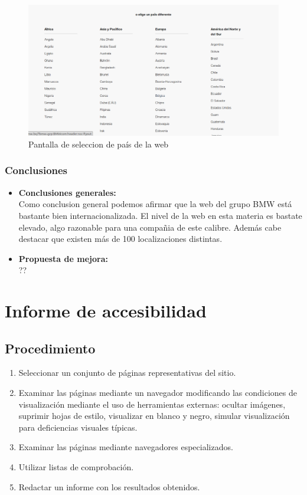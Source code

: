 \documentclass[a4paper,11pt]{article}
\begin{document}
\begin{itemize}
\begin{figure}[H]
  \centering
  \includegraphics[scale=0.3]{elige_idioma.png}
  \caption{Pantalla de seleccion de país de la web}
  \label{fig:selectpais}
\end{figure}


\end{itemize}

\subsubsection{Conclusiones}
\begin{itemize}
\item \textbf{Conclusiones generales:}\\
Como conclusion general podemos afirmar que la web del grupo BMW está bastante bien internacionalizada. El nivel de la web en esta materia es bastate elevado, algo razonable para una compañia de este calibre. Además cabe destacar que existen más de 100 localizaciones distintas.

\item \textbf{Propuesta de mejora:}\\
??


\end{itemize}

\section{Informe de accesibilidad}
\subsection{Procedimiento}
\begin{enumerate}
\item Seleccionar un conjunto de páginas representativas del sitio.
\item Examinar las páginas mediante un navegador modificando las condiciones de visualización mediante el uso de herramientas externas: ocultar imágenes, suprimir hojas de estilo, visualizar en blanco y negro, simular visualización para deficiencias visuales típicas.
\item Examinar las páginas mediante navegadores especializados.
\item Utilizar listas de comprobación.
\item Redactar un informe con los resultados obtenidos.
\end{enumerate}
\end{document}
